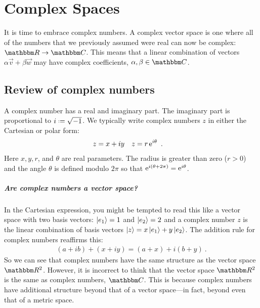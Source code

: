 \chapter{Complex Spaces}


It is time to embrace complex numbers. A complex vector space is one where all of the numbers that we previously assumed were real can now be complex: $\RR \to \CC$. This means that a linear combination of vectors $\alpha\vec{v}+ \beta\vec{w}$ may have complex coefficients, $\alpha,\beta\in\CC$. 

\section{Review of complex numbers}

A complex number has a real and imaginary part. The imaginary part is proportional to  $i \defeq \sqrt{-1}$. We typically write complex numbers $z$ in either the Cartesian or polar form:
\begin{align}
    z &= x+iy 
    &
    z &= r \operatorname{e}^{i\theta}
    \ .
\end{align}
Here $x,y,r$, and $\theta$ are real parameters. The radius is greater than zero ($r>0$) and the angle $\theta$ is defined modulo $2\pi$ so that $\operatorname{e}^{i(\theta+2\pi)} = \operatorname{e}^{i\theta}$.

\paragraph{Are complex numbers a vector space?}
In the Cartesian expression, you might be tempted to read this like a vector space with two basis vectors: $\left|e_1\right\rangle=1$ and $\left|e_2\right\rangle = 2$ and a complex number $z$ is the linear combination of basis vectors $\left|z\right\rangle = x \left|e_1\right\rangle + y \left|e_2\right\rangle$. The addition rule for complex numbers reaffirms this:
\begin{align}
    (a+ib)+ (x+iy) = (a+x) + i (b+y) \ .
\end{align}
So we can see that complex numbers have the same structure as the vector space $\RR^2$. However, it is incorrect to think that the vector space $\RR^2$ is the same as complex numbers, $\CC$. This is because complex numbers have additional structure beyond that of a vector space---in fact, beyond even that of a metric space. 

